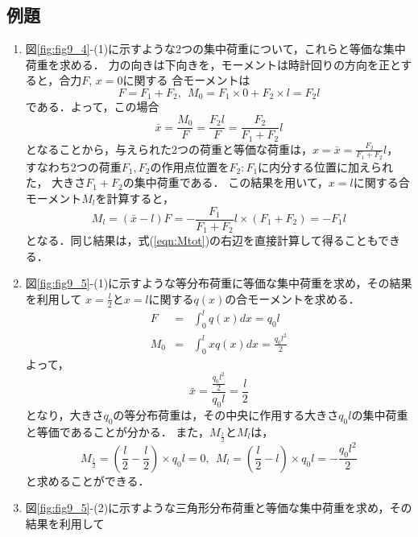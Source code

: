 \documentclass[10pt,a4j]{jarticle}
\begin{document}
\subsection{例題}
\begin{enumerate}
\item
図\ref{fig:fig9_4}-(1)に示すような2つの集中荷重について，これらと等価な集中荷重を求める．
力の向きは下向きを，モーメントは時計回りの方向を正とすると，合力$F$, $x=0$に関する
合モーメントは
\begin{equation}
	F=F_1+F_2, \ \ M_0=F_1\times 0 + F_2 \times l =F_2l
	\label{eqn:ans1_1}
\end{equation}
である．よって，この場合
\begin{equation}
	\bar x = \frac{M_0}{F}=\frac{F_2l}{F}= \frac{F_2}{F_1+F_2}l
	\label{eqn:xbar1_1}
\end{equation}
となることから，与えられた2つの荷重と等価な荷重は，$x=\bar x = \frac{F_2}{F_1+F_2}l$，
すなわち2つの荷重$F_1,F_2$の作用点位置を$F_2:F_1$に内分する位置に加えられた，
大きさ$F_1+F_2$の集中荷重である．
この結果を用いて，$x=l$に関する合モーメント$M_l$を計算すると，
\begin{equation}
	M_l=(\bar x- l ) F = -\frac{F_1}{F_1+F_2}l \times (F_1+F_2)= -F_1l
	\label{eqn:Ml1_1}
\end{equation}
となる．同じ結果は，式(\ref{eqn:Mtot})の右辺を直接計算して得ることもできる．
\item
図\ref{fig:fig9_5}-(1)に示すような等分布荷重に等価な集中荷重を求め，その結果を利用して
$x=\frac{l}{2}$と$x=l$に関する$q(x)$の合モーメントを求める．
\begin{eqnarray}
	F & =& \int _0^l q(x)dx= q_0l
	\label{eqn:}
	\\
	M_0 & =& \int _0^l xq(x)dx= \frac{q_0l^2}{2}
\end{eqnarray}
よって，
\begin{equation}
	\bar x= \frac{\frac{q_0l^2}{2}}{q_0l}=\frac{l}{2}
	\label{eqn:xbar_rec}
\end{equation}
となり，大きさ$q_0$の等分布荷重は，その中央に作用する大きさ$q_0l$の集中荷重と等価であることが分かる．
また，$M_{\frac{l}{2}}$と$M_{l}$は，
\begin{equation}
	M_{\frac{l}{2}}=\left(\frac{l}{2}-\frac{l}{2}\right)\times q_0l = 0 ,\ \ 
	M_{l}=\left(\frac{l}{2}-l\right)\times q_0l = -\frac{q_0l^2}{2}
	\label{eqn:}
\end{equation}
と求めることができる．
\item
図\ref{fig:fig9_5}-(2)に示すような三角形分布荷重と等価な集中荷重を求め，その結果を利用して

\end{enumerate}
\end{document}
